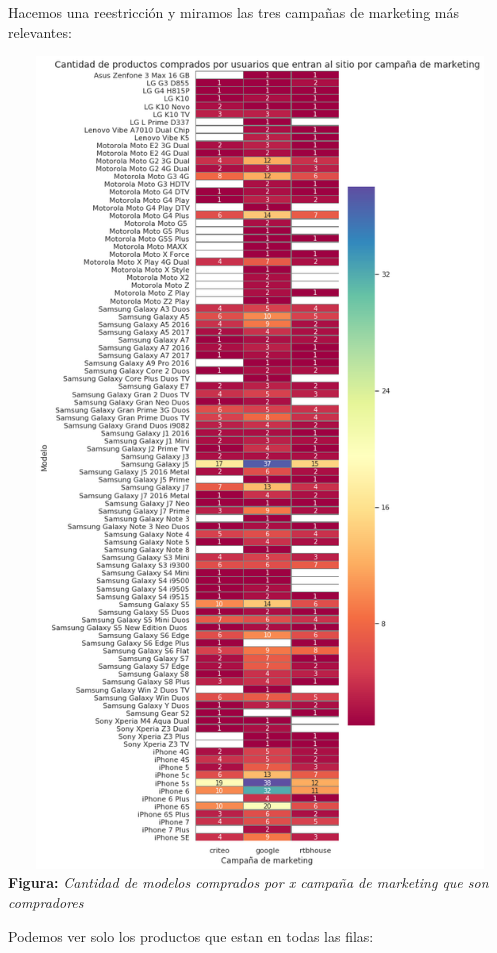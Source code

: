 \documentclass[titlepage,a4paper]{article}
\begin{document}
	Hacemos una reestricción y miramos las tres campañas de marketing más relevantes:
	
  \begin{center}
   \includegraphics[width=14cm, height=21.5cm]{modelosCamp2.png}\\
	\textbf{Figura:}  \textit{Cantidad de modelos comprados por \textit{x} campaña de marketing que son compradores}
	\end{center}
	
	Podemos ver solo los productos que estan en todas las filas:
\end{document}
